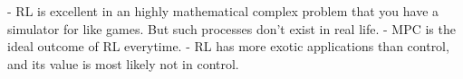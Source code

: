 - RL is excellent in an highly mathematical complex problem that you have a simulator for like games.  But such processes don't exist in real life.
- MPC is the ideal outcome of RL everytime.
- RL has more exotic applications than control, and its value is most likely not in control.